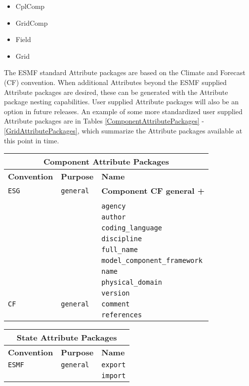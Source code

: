 \begin{itemize}
\item CplComp
\item GridComp
\item Field
\item Grid
\end{itemize}

The ESMF standard Attribute packages are based on the Climate and Forecast (CF) convention.  When additional Attributes beyond the ESMF supplied Attribute packages are desired, these can be generated with the Attribute package nesting capabilities.  User supplied Attribute packages will also be an option in future releases.  An example of some more standardized user supplied Attribute packages are in Tables \ref{ComponentAttributePackages} - \ref{GridAttributePackages}, which summarize the Attribute packages available at this point in time.

\vspace{18pt}

\begin{tabular}{|p{4cm}|p{4cm}|p{6cm}|}
\hline
\multicolumn{3}{|c|}{{\bf \large Component Attribute Packages}} \\
\hline\hline
{\bf Convention} & {\bf Purpose} & {\bf Name} \\
\hline\hline
{\tt ESG} & {\tt general} & {\bf Component CF general +} \\
     & & \\
     & & {\tt agency} \\
     & & {\tt author} \\
     & & {\tt coding\_language}  \\
     & & {\tt discipline}  \\
     & & {\tt full\_name} \\
     & & {\tt model\_component\_framework} \\
     & & {\tt name} \\
     & & {\tt physical\_domain}\\
     & & {\tt version} \\ 
\hline
{\tt CF} & {\tt general} & {\tt comment}\\
     & & {\tt references} \\
\hline
\end{tabular}
\label{ComponentAttributePackages}

\vspace{18pt}

\begin{tabular}{|p{4cm}|p{4cm}|p{6cm}|}
\hline
\multicolumn{3}{|c|}{{\bf \large State Attribute Packages}} \\
\hline\hline
{\bf Convention} & {\bf Purpose} & {\bf Name} \\
\hline\hline
{\tt ESMF} & {\tt general} & {\tt export}  \\
 & & {\tt import} \\ 
\hline
\end{tabular}
\label{StateAttributePackages}

